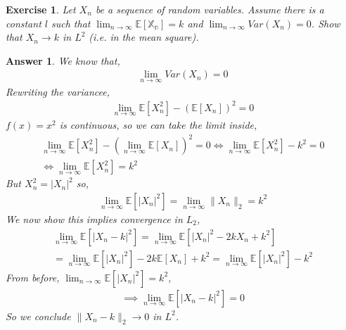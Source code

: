 \documentclass[12pt]{article}
\theoremstyle{colon}
\newtheorem{exercise}{Exercise}
\newtheorem*{answer}{Answer}
\begin{document}
\clearpage

\begin{exercise}
  Let $X_n$ be a sequence of random variables. Assume there is a constant $l$ such that $\lim_{n \rightarrow \infty}\mathbb{E[X_n]} = k$ and $\lim_{n \rightarrow \infty} Var(X_n) = 0$. Show that $X_n \rightarrow k$ in $L^2$ (i.e. in the mean square).
\end{exercise}

\begin{answer}
  We know that,
  \begin{gather*}
    \lim_{n \rightarrow \infty} Var(X_n) = 0
  \end{gather*}
  Rewriting the variancee,
  \begin{gather*}
    \lim_{n \rightarrow \infty} \mathbb{E}[X_n^2] - (\mathbb{E}[X_n])^2 = 0
  \end{gather*}
  $f(x) = x^2$ is continuous, so we can take the limit inside,
  \begin{gather*}
    \lim_{n \rightarrow \infty} \mathbb{E}[X_n^2] - (\lim_{n \rightarrow \infty} \mathbb{E}[X_n])^2 = 0 \Longleftrightarrow \lim_{n \rightarrow \infty} \mathbb{E}[X_n^2] - k^2 = 0 \\
    \Longleftrightarrow \lim_{n \rightarrow \infty} \mathbb{E}[X_n^2] = k^2
  \end{gather*}
  But $X_n^2 = \lvert X_n \rvert^2$ so,
  \begin{gather*}
    \lim_{n \rightarrow \infty} \mathbb{E}[\lvert X_n \rvert^2] = \lim_{n \rightarrow \infty} \lVert X_n \rVert_2 = k^2
  \end{gather*}
  We now show this implies convergence in $L_2$,
  \begin{gather*}
    \lim_{n \rightarrow \infty} \mathbb{E}[\lvert X_n - k \rvert^2] = \lim_{n \rightarrow \infty} \mathbb{E}[\lvert X_n \rvert^2 - 2k X_n + k^2 ] \\
    = \lim_{n \rightarrow \infty} \mathbb{E}[\lvert X_n \rvert^2] - 2k \mathbb{E}[X_n] + k^2 = \lim_{n \rightarrow \infty} \mathbb{E}[\lvert X_n \rvert^2] - k^2
  \end{gather*}
  From before, $\lim_{n \rightarrow \infty} \mathbb{E}[\lvert X_n \rvert^2] = k^2$,
  \begin{gather*}
    \implies \lim_{n \rightarrow \infty} \mathbb{E}[\lvert X_n - k \rvert^2] = 0
  \end{gather*}
  So we conclude $\lVert X_n -k \rVert_2 \rightarrow 0$ in $L^2$.
\end{answer}
\end{document}
